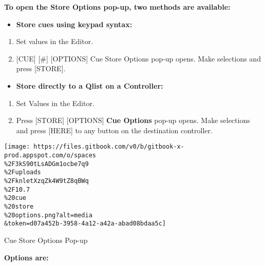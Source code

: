 \documentclass[
]{article}
\providecommand{\tightlist}{%
  \setlength{\itemsep}{0pt}\setlength{\parskip}{0pt}}
\begin{document}
\textbf{To open the Store Options pop-up, two methods are available:}

\begin{itemize}
\tightlist
\item
  \textbf{Store cues using keypad syntax:}
\end{itemize}

\begin{enumerate}
\def\labelenumi{\arabic{enumi}.}
\item
  Set values in the Editor.
\item
  {[}CUE{]} {[}\#{]} {[}OPTIONS{]} Cue Store Options pop-up opens. Make selections and press {[}STORE{]}.
\end{enumerate}

\begin{itemize}
\tightlist
\item
  \textbf{Store directly to a Qlist on a Controller:}
\end{itemize}

\begin{enumerate}
\def\labelenumi{\arabic{enumi}.}
\item
  Set Values in the Editor.
\item
  Press {[}STORE{]} {[}OPTIONS{]} \textbf{Cue Options} pop-up opens. Make selections and press {[}HERE{]} to any button on the destination controller.
\end{enumerate}

\texttt{[image: https://files.gitbook.com/v0/b/gitbook-x-prod.appspot.com/o/spaces\\\%2F3kS90tLsADGm1ocbe7q9\\\%2Fuploads\\\%2FknletXzqZk4W9tZ8qBWq\\\%2F10.7\\\%20cue\\\%20store\\\%20options.png?alt=media\\\&token=d07a452b-3958-4a12-a42a-abad08bdaa5c]}

Cue Store Options Pop-up

\textbf{Options are:}
\end{document}
